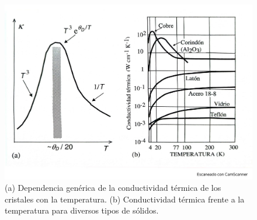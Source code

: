 \begin{figure}[h!] \centering
    \includegraphics[scale=0.35]{Cuerpo/Ch_05/Fotos libro 9.pdf}
    \caption{(a) Dependencia genérica de la conductividad térmica de los cristales con la temperatura. (b) Conductividad térmica frente a la temperatura para diversos tipos de sólidos.}
    \label{Fig:05-09}
\end{figure}    

